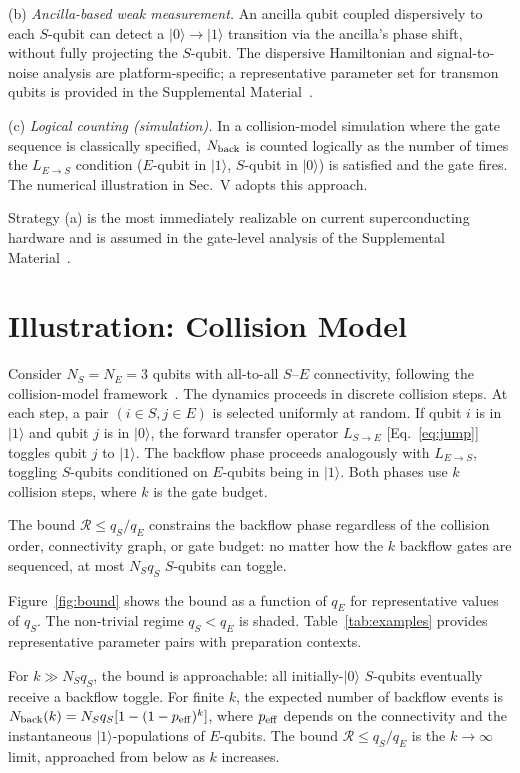 \documentclass[aps,pra,twocolumn,superscriptaddress,floatfix]{revtex4-2}
\begin{document}
(b) \textit{Ancilla-based weak measurement.} An ancilla qubit coupled dispersively to each $S$-qubit can detect a $|0\rangle \to |1\rangle$ transition via the ancilla's phase shift, without fully projecting the $S$-qubit. The dispersive Hamiltonian and signal-to-noise analysis are platform-specific; a representative parameter set for transmon qubits is provided in the Supplemental Material~\cite{SM}.

(c) \textit{Logical counting (simulation).} In a collision-model simulation where the gate sequence is classically specified, $N_{\rm back}$ is counted logically as the number of times the $L_{E\to S}$ condition ($E$-qubit in $|1\rangle$, $S$-qubit in $|0\rangle$) is satisfied and the gate fires. The numerical illustration in Sec.~V adopts this approach.

Strategy (a) is the most immediately realizable on current superconducting hardware and is assumed in the gate-level analysis of the Supplemental Material~\cite{SM}.

\section{Illustration: Collision Model}

Consider $N_S = N_E = 3$ qubits with all-to-all $S$--$E$ connectivity, following the collision-model framework~\cite{Ciccarello:2013}. The dynamics proceeds in discrete collision steps. At each step, a pair $(i \in S, j \in E)$ is selected uniformly at random. If qubit $i$ is in $|1\rangle$ and qubit $j$ is in $|0\rangle$, the forward transfer operator $L_{S\to E}$ [Eq.~\eqref{eq:jump}] toggles qubit $j$ to $|1\rangle$. The backflow phase proceeds analogously with $L_{E\to S}$, toggling $S$-qubits conditioned on $E$-qubits being in $|1\rangle$. Both phases use $k$ collision steps, where $k$ is the gate budget.

The bound $\mathcal{R} \leq q_S/q_E$ constrains the backflow phase regardless of the collision order, connectivity graph, or gate budget: no matter how the $k$ backflow gates are sequenced, at most $N_S q_S$ $S$-qubits can toggle.

Figure~\ref{fig:bound} shows the bound as a function of $q_E$ for representative values of $q_S$. The non-trivial regime $q_S < q_E$ is shaded. Table~\ref{tab:examples} provides representative parameter pairs with preparation contexts.

For $k \gg N_S q_S$, the bound is approachable: all initially-$|0\rangle$ $S$-qubits eventually receive a backflow toggle. For finite $k$, the expected number of backflow events is $N_{\rm back}(k) = N_S q_S [1 - (1 - p_{\rm eff})^k]$, where $p_{\rm eff}$ depends on the connectivity and the instantaneous $|1\rangle$-populations of $E$-qubits. The bound $\mathcal{R} \leq q_S/q_E$ is the $k \to \infty$ limit, approached from below as $k$ increases.
\end{document}
